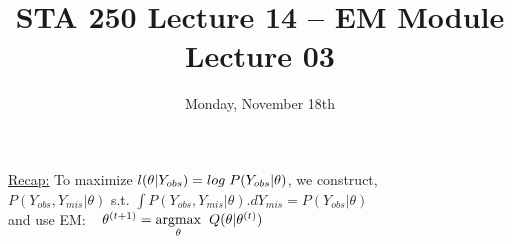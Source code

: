 \documentclass[12pt]{article}
\begin{document}
%
\title{STA 250 Lecture 14 -- EM Module Lecture 03}

\date{Monday, November 18th}

\maketitle

\uline{Recap:} To maximize $l({\theta}|Y_{obs}) = log\hspace{1 mm} P(Y_{obs}|\theta)$, we construct,\\

 $P(Y_{obs}, Y_{mis}|\theta)$ s.t. $\int P(Y_{obs}, Y_{mis}|\theta). dY_{mis} = P(Y_{obs}|\theta)$\\

and use EM: $\hspace{3 mm} \theta^{(t+1)}= \underset{\theta}{\operatorname{argmax}}\hspace{2 mm} Q(\theta|\theta^{(t)})$\\
\end{document}
